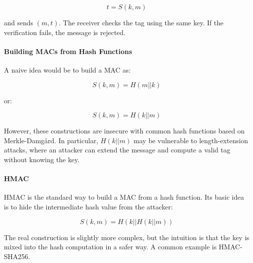 \[
t = S(k,m)
\]

and sends $(m,t)$. The receiver checks the tag using the same key. If the
verification fails, the message is rejected.

\paragraph{Building MACs from Hash Functions}

A naive idea would be to build a MAC as:

\[
S(k,m)=H(m || k)
\]

or:

\[
S(k,m)=H(k || m)
\]

However, these constructions are insecure with common hash functions
based on Merkle-Damg{\aa}rd. In particular, $H(k||m)$ may be vulnerable
to length-extension attacks, where an attacker can extend the message
and compute a valid tag without knowing the key.

\paragraph{HMAC}

HMAC is the standard way to build a MAC from a hash function. Its basic
idea is to hide the intermediate hash value from the attacker:

\[
S(k,m)=H(k || H(k || m))
\]

The real construction is slightly more complex, but the intuition is that
the key is mixed into the hash computation in a safer way. A common
example is HMAC-SHA256.


